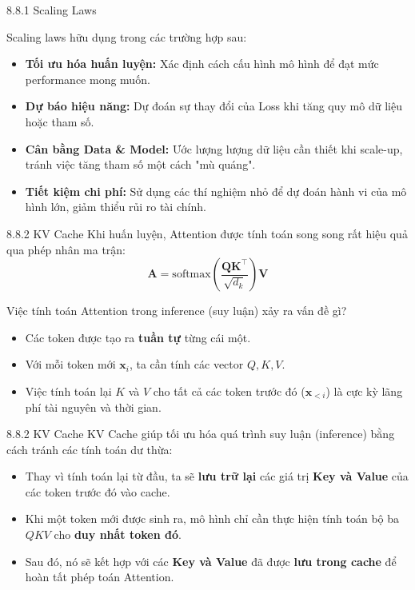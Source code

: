 \begin{frame}{8.8.1 Scaling Laws}

	Scaling laws hữu dụng trong các trường hợp sau:
	\begin{itemize}
		\item \textbf{Tối ưu hóa huấn luyện:} Xác định cách cấu hình mô hình để đạt mức performance mong muốn.
		\item \textbf{Dự báo hiệu năng:} Dự đoán sự thay đổi của Loss khi tăng quy mô dữ liệu hoặc tham số.
		\item \textbf{Cân bằng Data \& Model:} Ước lượng lượng dữ liệu cần thiết khi scale-up, tránh việc tăng tham số một cách "mù quáng".
		\item \textbf{Tiết kiệm chi phí:} Sử dụng các thí nghiệm nhỏ để dự đoán hành vi của mô hình lớn, giảm thiểu rủi ro tài chính.
	\end{itemize}
\end{frame}


\begin{frame}{8.8.2 KV Cache}
	Khi huấn luyện, Attention được tính toán song song rất hiệu quả qua phép nhân ma trận:
	\begin{equation*}
		\mathbf{A} = \text{softmax}\left(\frac{\mathbf{QK}^\top}{\sqrt{d_k}}\right)\mathbf{V} \tag{8.53}
	\end{equation*}
	
	Việc tính toán Attention trong inference (suy luận) xảy ra vấn đề gì?
 
	\pause
	
	\begin{itemize}
		\item Các token được tạo ra \textbf{tuần tự} từng cái một.
		\item Với mỗi token mới $\mathbf{x}_i$, ta cần tính các vector $Q, K, V$.
		\item Việc tính toán lại $K$ và $V$ cho tất cả các token trước đó ($\mathbf{x}_{<i}$) là cực kỳ lãng phí tài nguyên và thời gian.
	\end{itemize}

\end{frame}

\begin{frame}{8.8.2 KV Cache}
KV Cache giúp tối ưu hóa quá trình suy luận (inference) bằng cách tránh các tính toán dư thừa:
	\vspace{1em}
\begin{itemize}
	\item Thay vì tính toán lại từ đầu, ta sẽ \textbf{lưu trữ lại} các giá trị \textbf{Key và Value} của các token trước đó vào cache.
	\vspace{0.5em}
	\item Khi một token mới được sinh ra, mô hình chỉ cần thực hiện tính toán bộ ba $QKV$ cho \textbf{duy nhất token đó}. 
	\vspace{0.5em}
	\item Sau đó, nó sẽ kết hợp với các \textbf{Key và Value} đã được \textbf{lưu trong cache} để hoàn tất phép toán Attention.

\end{itemize}
\end{frame}

